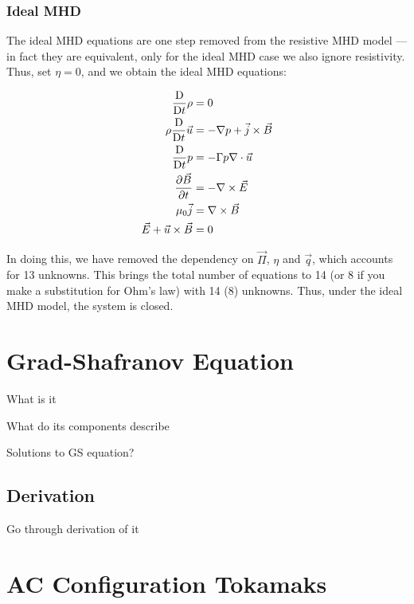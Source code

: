 \subsubsection{Ideal MHD}
The ideal MHD equations are one step removed from the resistive MHD model --- in fact they are equivalent, only for the ideal MHD case 
we also ignore resistivity. Thus, set $\eta = 0$, and we obtain the ideal MHD equations:
\begin{definition}
    \begin{align}
        \frac{\text{D}}{\text{D} t} \rho &= 0 \\
        \rho \frac{\text{D}}{\text{D} t} \vec{u} &= -\nabla p + \vec{j} \times \vec{B}\\
        \frac{\text{D}}{\text{D} t} p  &= -\Gamma p \nabla \cdot \vec{u} \\
        \pdv{\vec{B}}{t} &= -\nabla \times \vec{E} \\
        \mu_0 \vec{j} &= \nabla \times \vec{B} \\
        \vec{E} + \vec{u} \times \vec{B} &= 0
    \end{align}
\end{definition}

\begin{remark}
    In doing this, we have removed the dependency on $\vec{\Pi}$, $\eta$ and $\vec{q}$, which accounts 
    for 13 unknowns. This brings the total number of equations to 14 (or $8$ if you make a substitution 
    for Ohm's law) with 14 ($8$) unknowns. Thus, under the ideal MHD model, the system is closed.
\end{remark}


\section{Grad-Shafranov Equation}

What is it

What do its components describe

Solutions to GS equation?

\subsection{Derivation}

Go through derivation of it 

\section{AC Configuration Tokamaks}


